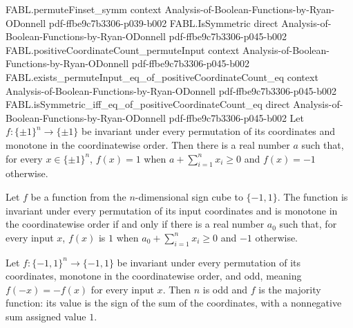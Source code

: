 \begin{theorem}
\proofstep
  {FABL.permuteFinset_symm}
  {context}
  {Analysis-of-Boolean-Functions-by-Ryan-ODonnell}
  {pdf-ffbe9c7b3306-p039-b002}
\proofstep
  {FABL.IsSymmetric}
  {direct}
  {Analysis-of-Boolean-Functions-by-Ryan-ODonnell}
  {pdf-ffbe9c7b3306-p045-b002}
\proofstep
  {FABL.positiveCoordinateCount_permuteInput}
  {context}
  {Analysis-of-Boolean-Functions-by-Ryan-ODonnell}
  {pdf-ffbe9c7b3306-p045-b002}
\proofstep
  {FABL.exists_permuteInput_eq_of_positiveCoordinateCount_eq}
  {context}
  {Analysis-of-Boolean-Functions-by-Ryan-ODonnell}
  {pdf-ffbe9c7b3306-p045-b002}
\proofstep
  {FABL.isSymmetric_iff_eq_of_positiveCoordinateCount_eq}
  {direct}
  {Analysis-of-Boolean-Functions-by-Ryan-ODonnell}
  {pdf-ffbe9c7b3306-p045-b002}
Let $f:\{\pm1\}^n\to\{\pm1\}$ be invariant under every permutation of its coordinates
and monotone in the coordinatewise order. Then there is a real number $a$ such that, for
every $x\in\{\pm1\}^n$, $f(x)=1$ when $a+\sum_{i=1}^n x_i\ge 0$ and $f(x)=-1$ otherwise.
\end{theorem}

\begin{theorem}
\label{FABL.symmetric_and_monotone_iff_isEqualWeightThreshold}
\leanok
{}
Let $f$ be a function from the $n$-dimensional sign cube to $\{−1,1\}$. The function
is invariant under every permutation of its input coordinates and is monotone in the
coordinatewise order if and only if there is a real number $a_0$ such that, for every
input $x$, $f(x)$ is $1$ when $a_0+\sum_{i=1}^n x_i\ge 0$ and $-1$ otherwise.
\end{theorem}

\begin{theorem}
\label{FABL.may_theorem}
\leanok
{}
Let $f:\{-1,1\}^n\to\{-1,1\}$ be invariant under every permutation of its coordinates,
monotone in the coordinatewise order, and odd, meaning $f(-x)=-f(x)$ for every input
$x$. Then $n$ is odd and $f$ is the majority function: its value is the sign of the sum
of the coordinates, with a nonnegative sum assigned value $1$.
\end{theorem}
